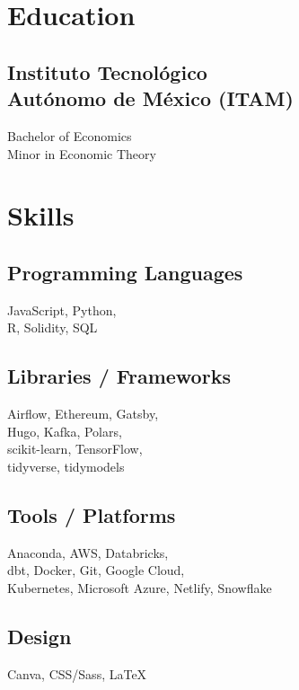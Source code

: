 \documentclass[]{resume}
\begin{document}
\hfill
\begin{minipage}[t]{0.25\textwidth}


	\section{Education}
	\subsection{Instituto Tecnológico \\ Autónomo de México (ITAM)}
	\sectionsep
	Bachelor of Economics \\
	Minor in Economic Theory \\
	\sectionsep
	\sectionsep


	\section{Skills}
	\subsection{Programming Languages}
	\sectionsep
	JavaScript,
	Python, \\
	R,
	Solidity,
	SQL
	\sectionsep
	\sectionsep
	\subsection{Libraries / Frameworks}
	\sectionsep
	Airflow,
	Ethereum,
	Gatsby, \\
	Hugo,
	Kafka,
	Polars, \\
	scikit-learn,
	TensorFlow, \\
	tidyverse,
	tidymodels
	\sectionsep
	\sectionsep
	\subsection{Tools / Platforms}
	Anaconda,
	AWS,
	Databricks, \\
	dbt,
	Docker,
	Git,
	Google Cloud, \\
	Kubernetes,
	Microsoft Azure,
	Netlify,
	Snowflake
	\sectionsep
	\sectionsep
	\subsection{Design}
	Canva,
	CSS/Sass,
	LaTeX
	\sectionsep
	\sectionsep


\end{minipage}
\end{document}

